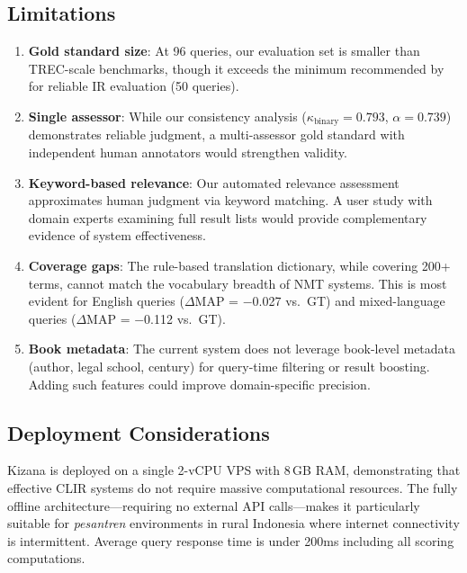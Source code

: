 \documentclass[preprint,12pt,numbers]{elsarticle}
\begin{document}
\subsection{Limitations}

\begin{enumerate}
    \item \textbf{Gold standard size}: At 96 queries, our evaluation set is smaller than TREC-scale benchmarks, though it exceeds the minimum recommended by \citet{zobel1998reliable} for reliable IR evaluation (50 queries).

    \item \textbf{Single assessor}: While our consistency analysis ($\kappa_{\text{binary}} = 0.793$, $\alpha = 0.739$) demonstrates reliable judgment, a multi-assessor gold standard with independent human annotators would strengthen validity.

    \item \textbf{Keyword-based relevance}: Our automated relevance assessment approximates human judgment via keyword matching. A user study with domain experts examining full result lists would provide complementary evidence of system effectiveness.

    \item \textbf{Coverage gaps}: The rule-based translation dictionary, while covering 200+ terms, cannot match the vocabulary breadth of NMT systems. This is most evident for English queries ($\Delta$MAP = $-$0.027 vs.\ GT) and mixed-language queries ($\Delta$MAP = $-$0.112 vs.\ GT).

    \item \textbf{Book metadata}: The current system does not leverage book-level metadata (author, legal school, century) for query-time filtering or result boosting. Adding such features could improve domain-specific precision.
\end{enumerate}

\subsection{Deployment Considerations}

Kizana is deployed on a single 2-vCPU VPS with 8\,GB RAM, demonstrating that effective CLIR systems do not require massive computational resources. The fully offline architecture---requiring no external API calls---makes it particularly suitable for \textit{pesantren} environments in rural Indonesia where internet connectivity is intermittent. Average query response time is under 200ms including all scoring computations.
\end{document}
